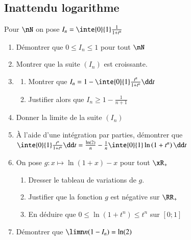 \documentclass[oneside,12pt]{article}          %
\begin{document}
\subsection{Inattendu logarithme}
Pour $\nN$ on pose $I_n=\inte{0}{1}\frac{1}{1+t^n}$
\begin{enumerate}
	\item Démontrer que $0\leq I_n\leq1$ pour tout $\nN$
	\item Montrer que la suite $(I_n)$ est croissante.
	\item \begin{enumerate}
		\item Montrer que $I_n=1-\inte{0}{1}\frac{t^n}{1+t^n}\dd t$
		\item Justifier alors que $I_n\geq1-\frac{1}{n+1}$
	\end{enumerate}	 
	\item Donner la limite de la suite $(I_n)$
	\item À l'aide d'une intégration par parties, démontrer que $\inte{0}{1}\frac{t^n}{1+t^n}\dd t = \frac{\ln(2)}{n}-\frac{1}{n}\inte{0}{1}\ln\left(1+t^n\right)\dd t$
	\item On pose $g:x\mapsto\ln(1+x)-x$ pour tout $\xR_+$
	\begin{enumerate}
		\item Dresser le tableau de variations de $g$.
		\item Justifier que la fonction $g$ est négative sur $\RR_+$
		\item En déduire que $0\leq\ln\left(1+t^n\right)\leq t^n$ sur $[0;1]$
	\end{enumerate}
	\item Démontrer que $\limn n(1-I_n)=\ln(2)$
\end{enumerate}
\end{document}

